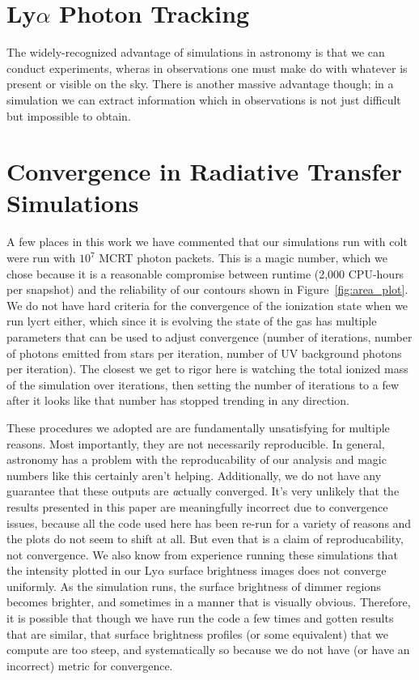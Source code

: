 \section{Ly$\alpha$ Photon Tracking}

The widely-recognized advantage of simulations in astronomy is that we can conduct experiments, wheras in observations one must make do with whatever is present or visible on the sky.
There is another massive advantage though; in a simulation we can extract information which in observations is not just difficult but impossible to obtain.


\section{Convergence in Radiative Transfer Simulations}

A few places in this work we have commented that our simulations run with {\sc colt} were run with $10^{7}$ MCRT photon packets.
This is a magic number, which we chose because it is a reasonable compromise between runtime (2,000 CPU-hours per snapshot) and the reliability of our contours shown in Figure~\ref{fig:area_plot}.
We do not have hard criteria for the convergence of the ionization state when we run {\sc lycrt} either, which since it is evolving the state of the gas has multiple parameters that can be used to adjust convergence (number of iterations, number of photons emitted from stars per iteration, number of UV background photons per iteration).
The closest we get to rigor here is watching the total ionized mass of the simulation over iterations, then setting the number of iterations to a few after it looks like that number has stopped trending in any direction.

These procedures we adopted are are fundamentally unsatisfying for multiple reasons.
Most importantly, they are not necessarily reproducible.
In general, astronomy has a problem with the reproducability of our analysis and magic numbers like this certainly aren't helping.
Additionally, we do not have any guarantee that these outputs are {\emph actually} converged.
It's very unlikely that the results presented in this paper are meaningfully incorrect due to convergence issues, because all the code used here has been re-run for a variety of reasons and the plots do not seem to shift at all.
But even that is a claim of reproducability, not convergence.
We also know from experience running these simulations that the intensity plotted in our Ly$\alpha$ surface brightness images does not converge uniformly.
As the simulation runs, the surface brightness of dimmer regions becomes brighter, and sometimes in a manner that is visually obvious.
Therefore, it is possible that though we have run the code a few times and gotten results that are similar, that surface brightness profiles (or some equivalent) that we compute are too steep, and systematically so because we do not have (or have an incorrect) metric for convergence.

